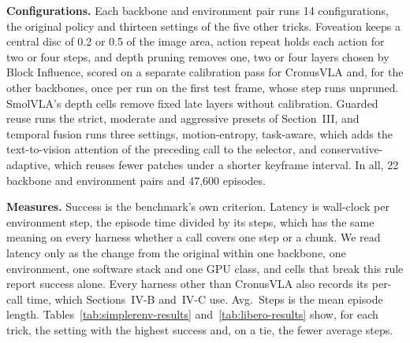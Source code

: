 \textbf{Configurations.} Each backbone and environment pair runs 14
configurations, the original policy and thirteen settings of the five
other tricks. Foveation keeps a
central disc of 0.2 or 0.5 of the image area, action repeat holds each
action for two or four steps, and depth pruning removes one, two or four
layers chosen by Block Influence, scored on a separate calibration pass
for CronusVLA and, for the other backbones, once per run on the first
test frame, whose step runs unpruned. SmolVLA's depth cells remove fixed
late layers without calibration.
Guarded reuse runs the strict, moderate and aggressive presets of
Section~III, and temporal fusion runs three settings, motion-entropy,
task-aware, which adds the text-to-vision attention of the preceding call
to the selector, and conservative-adaptive, which reuses fewer patches
under a shorter keyframe interval. In all, 22 backbone and environment
pairs and 47,600 episodes.

\textbf{Measures.} Success is the benchmark's own criterion. Latency is
wall-clock per environment step, the episode time divided by its steps,
which has the same meaning on every harness whether a call covers one step
or a chunk. We read latency only as the change from the original within one backbone, one
environment, one software stack and one GPU class, and cells that break
this rule report success alone.
Every harness other than CronusVLA also records its per-call time, which
Sections~IV-B and~IV-C use.
Avg.\ Steps is the mean episode length. Tables~\ref{tab:simplerenv-results}
and~\ref{tab:libero-results} show, for each trick, the setting with the
highest success and, on a tie, the fewer average steps.

